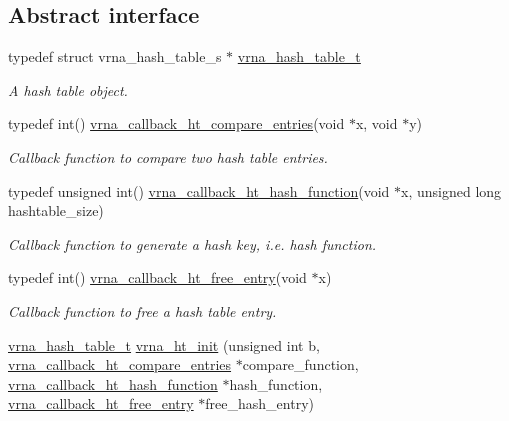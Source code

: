 \subsection*{Abstract interface}
\begin{DoxyCompactItemize}
\item 
typedef struct vrna\+\_\+hash\+\_\+table\+\_\+s $\ast$ \hyperlink{group__hash__table__utils_gabc7c6f41b718c8e23929e528891a89c4}{vrna\+\_\+hash\+\_\+table\+\_\+t}
\begin{DoxyCompactList}\small\item\em A hash table object. \end{DoxyCompactList}\item 
typedef int() \hyperlink{group__hash__table__utils_gace4adf608f9dc246f66f6264d30c0f8d}{vrna\+\_\+callback\+\_\+ht\+\_\+compare\+\_\+entries}(void $\ast$x, void $\ast$y)
\begin{DoxyCompactList}\small\item\em Callback function to compare two hash table entries. \end{DoxyCompactList}\item 
typedef unsigned int() \hyperlink{group__hash__table__utils_ga8533dc0cb44035d5fdb05e3c28922d2b}{vrna\+\_\+callback\+\_\+ht\+\_\+hash\+\_\+function}(void $\ast$x, unsigned long hashtable\+\_\+size)
\begin{DoxyCompactList}\small\item\em Callback function to generate a hash key, i.\+e. hash function. \end{DoxyCompactList}\item 
typedef int() \hyperlink{group__hash__table__utils_ga3ff18cc70db8bb6f8cfee2c2b1542afc}{vrna\+\_\+callback\+\_\+ht\+\_\+free\+\_\+entry}(void $\ast$x)
\begin{DoxyCompactList}\small\item\em Callback function to free a hash table entry. \end{DoxyCompactList}\item 
\hyperlink{group__hash__table__utils_gabc7c6f41b718c8e23929e528891a89c4}{vrna\+\_\+hash\+\_\+table\+\_\+t} \hyperlink{group__hash__table__utils_ga37d1c7e13087a2b7c1b87fda34577c29}{vrna\+\_\+ht\+\_\+init} (unsigned int b, \hyperlink{group__hash__table__utils_gace4adf608f9dc246f66f6264d30c0f8d}{vrna\+\_\+callback\+\_\+ht\+\_\+compare\+\_\+entries} $\ast$compare\+\_\+function, \hyperlink{group__hash__table__utils_ga8533dc0cb44035d5fdb05e3c28922d2b}{vrna\+\_\+callback\+\_\+ht\+\_\+hash\+\_\+function} $\ast$hash\+\_\+function, \hyperlink{group__hash__table__utils_ga3ff18cc70db8bb6f8cfee2c2b1542afc}{vrna\+\_\+callback\+\_\+ht\+\_\+free\+\_\+entry} $\ast$free\+\_\+hash\+\_\+entry)

\end{DoxyCompactItemize}
